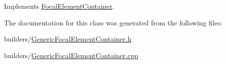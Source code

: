 Implements \hyperlink{classFocalElementContainer_a444a088fc937650226f2ecdd1db59510}{Focal\+Element\+Container}.



The documentation for this class was generated from the following files\+:\begin{DoxyCompactItemize}
\item 
builders/\hyperlink{GenericFocalElementContainer_8h}{Generic\+Focal\+Element\+Container.\+h}\item 
builders/\hyperlink{GenericFocalElementContainer_8cpp}{Generic\+Focal\+Element\+Container.\+cpp}\end{DoxyCompactItemize}
